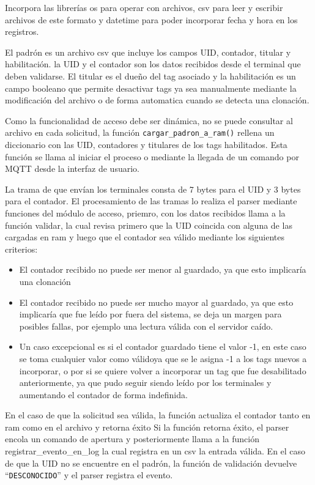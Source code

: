 Incorpora las librerías os para operar con archivos, csv para leer y escribir archivos de este formato y datetime para poder incorporar fecha y hora en los registros.

El padrón es un archivo csv que incluye los campos UID, contador, titular y habilitación.
la UID y el contador son los datos recibidos desde el terminal que deben validarse. El titular es el dueño del tag asociado y la habilitación es un campo booleano que permite desactivar tags ya sea manualmente  mediante la modificación del archivo o de forma automatica cuando se detecta una clonación.

Como la funcionalidad de acceso debe ser dinámica, no se puede consultar al archivo en cada solicitud, la función \texttt{cargar\_padron\_a\_ram()} rellena un diccionario con las UID, contadores y titulares de los tags habilitados. Esta función se llama al iniciar el proceso o mediante la llegada de un comando por MQTT desde la interfaz de usuario.

La trama de que envían los terminales consta de 7 bytes para el UID y 3 bytes para el contador.
El procesamiento de las tramas lo realiza el parser mediante funciones del módulo de acceso, priemro, con los datos recibidos llama a la función validar, la cual revisa primero que la UID coincida con alguna de las cargadas en ram y luego que el contador sea válido mediante los siguientes criterios:

\begin{itemize}
    \item El contador recibido no puede ser menor al guardado, ya que esto implicaría una clonación
    \item El contador recibido no puede ser mucho mayor al guardado, ya que esto implicaría que fue leído por fuera del sistema, se deja un margen para posibles fallas, por ejemplo una lectura válida con el servidor caído.
    \item Un caso excepcional es si el contador guardado tiene el valor -1, en este caso se toma cualquier valor como válidoya que se le asigna -1 a los tags nuevos a incorporar, o por si se quiere volver a incorporar un tag que fue desabilitado anteriormente, ya que pudo seguir siendo leído por los terminales y aumentando el contador de forma indefinida.
\end{itemize}

En el caso de que la solicitud sea válida, la función actualiza el contador tanto en ram como en el archivo y retorna éxito
Si la función retorna éxito, el parser encola un comando de apertura y posteriormente llama a la función registrar\_evento\_en\_log la cual registra en un csv la entrada válida.
En el caso de que la UID no se encuentre en el padrón, la función de validación devuelve \enquote{\texttt{DESCONOCIDO}} y el parser registra el evento.

